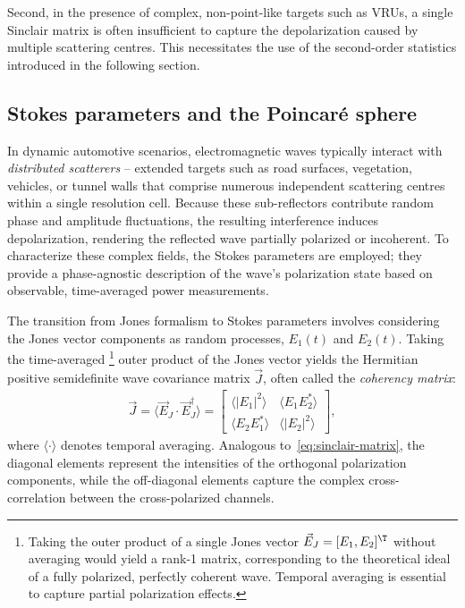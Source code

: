Second, in the presence of complex, non-point-like targets such as VRUs, a single Sinclair matrix is often insufficient to capture the depolarization caused by multiple scattering centres.
This necessitates the use of the second-order statistics introduced in the following section.


\subsection{Stokes parameters and the Poincaré sphere}
\label{sec:stokes-poincare}

In dynamic automotive scenarios, electromagnetic waves typically interact with \emph{distributed scatterers} -- extended targets such as road surfaces, vegetation, vehicles, or tunnel walls that comprise numerous independent scattering centres within a single resolution cell.
Because these sub-reflectors contribute random phase and amplitude fluctuations, the resulting interference induces depolarization, rendering the reflected wave partially polarized or incoherent.
To characterize these complex fields, the Stokes parameters are employed; they provide a phase-agnostic description of the wave's polarization state based on observable, time-averaged power measurements.

The transition from Jones formalism to Stokes parameters involves considering the Jones vector components as random processes, $E_1(t)$ and $E_2(t)$.
Taking the time-averaged%
    \footnote{
        Taking the outer product of a single Jones vector $\vec E_J=[E_1,E_2]^\T$ without averaging would yield a rank-1 matrix, corresponding to the theoretical ideal of a fully polarized, perfectly coherent wave.
        Temporal averaging is essential to capture partial polarization effects.
    }
outer product of the Jones vector yields the Hermitian positive semidefinite wave covariance matrix $\vec J$, often called the \emph{coherency matrix}:
\begin{align}
    \label{eq:coherency-matrix}
    \vec J = \langle \vec E_J \cdot \vec E_J^\dagger \rangle = \begin{bmatrix}
        \langle |E_1|^2 \rangle & \langle E_1 E_2^* \rangle \\
        \langle E_2 E_1^* \rangle & \langle |E_2|^2 \rangle
    \end{bmatrix},
\end{align}
where $\langle \cdot \rangle$ denotes temporal averaging.
Analogous to~\cref{eq:sinclair-matrix}, the diagonal elements represent the intensities of the orthogonal polarization components, while the off-diagonal elements capture the complex cross-correlation between the cross-polarized channels.


